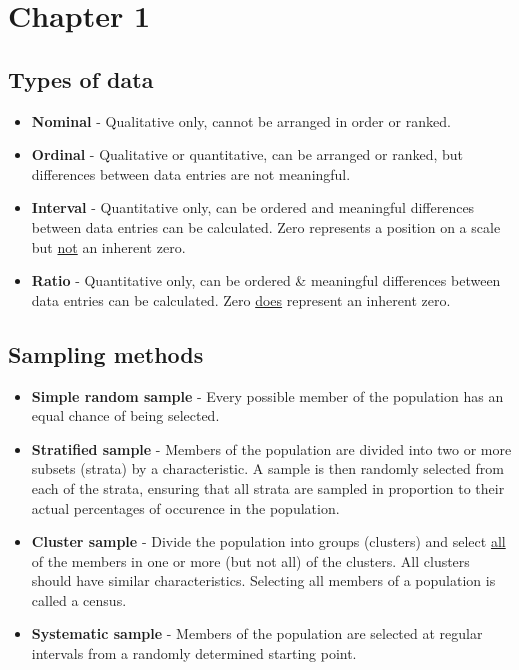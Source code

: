 \documentclass[a4paper]{article}
\let\bf\textbf
\begin{document}
\section{Chapter 1}
\subsection{Types of data}
\begin{itemize}
    \item \bf{Nominal} - Qualitative only, cannot be arranged in order or ranked.
    \item \bf{Ordinal} - Qualitative or quantitative, can be arranged or ranked, but differences between data entries are not meaningful.
    \item \bf{Interval} - Quantitative only, can be ordered and meaningful differences between data entries can be calculated. Zero represents a position on a scale but \underline{not} an inherent zero.
    \item \bf{Ratio} - Quantitative only, can be ordered \& meaningful differences between data entries can be calculated. Zero \underline{does} represent an inherent zero.
\end{itemize}

\subsection{Sampling methods}
\begin{itemize}
    \item \bf{Simple random sample} - Every possible member of the population has an equal chance of being selected.
    \item \bf{Stratified sample} - Members of the population are divided into two or more subsets (strata) by a characteristic. A sample is then randomly selected from each of the strata, ensuring that all strata are sampled in proportion to their actual percentages of occurence in the population.
    \item \bf{Cluster sample} - Divide the population into groups (clusters) and select \underline{all} of the members in one or more (but not all) of the clusters. All clusters should have similar characteristics. Selecting all members of a population is called a census.
    \item \bf{Systematic sample} - Members of the population are selected at regular intervals from a randomly determined starting point.
\end{itemize}
\end{document}
